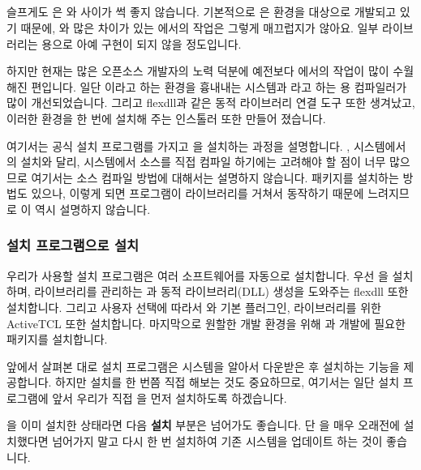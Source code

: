\subsection{\WINDOWS{}}

슬프게도 \OCAML{}은 \WINDOWS{}와 사이가 썩 좋지 않습니다. 기본적으로
\OCAML{}은 \UNIX{} 환경을 대상으로 개발되고 있기 때문에, \UNIX{}와 많은 차이가
있는 \WINDOWS{}에서의 \OCAML{} 작업은 그렇게 매끄럽지가 않아요. 일부
라이브러리는 \WINDOWS{} 용으로 아예 구현이 되지 않을 정도입니다.

하지만 현재는 많은 오픈소스 개발자의 노력 덕분에 예전보다 \WINDOWS{}에서의
작업이 많이 수월해진 편입니다. 일단 \CYGWIN{}이라고 하는 \UNIX{} 환경을
흉내내는 시스템과 \MINGW{}라고 하는 \WINDOWS{} 용 \CC{} 컴파일러가 많이
개선되었습니다. 그리고 \textsf{flexdll}과 같은 동적 라이브러리 연결 도구 또한
생겨났고, 이러한 환경을 한 번에 설치해 주는 인스톨러 또한 만들어 졌습니다.

여기서는 \OCAML{} 공식 설치 프로그램를 가지고 \OCAML{}을 설치하는 과정을
설명합니다. \LINUX{}, \MAC{} 시스템에서의 설치와 달리, \WINDOWS{} 시스템에서
소스를 직접 컴파일 하기에는 고려해야 할 점이 너무 많으므로 여기서는 소스
컴파일 방법에 대해서는 설명하지 않습니다. \CYGWIN{} 패키지를 설치하는 방법도
있으나, 이렇게 되면 \OCAML{} 프로그램이 \CYGWIN{} 라이브러리를 거쳐서 동작하기
때문에 느려지므로 이 역시 설명하지 않습니다.

\subsubsection{설치 프로그램으로 설치}

우리가 사용할 설치 프로그램은 여러 소프트웨어를 자동으로 설치합니다. 우선
\OCAML{}을 설치하며, \OCAML{} 라이브러리를 관리하는 \FINDLIB{}과 동적
라이브러리(DLL) 생성을 도와주는 \textsf{flexdll} 또한 설치합니다. 그리고
사용자 선택에 따라서 \EMACS{}와 \OCAML{} 기본 \EMACS{} 플러그인, \TK{}
라이브러리를 위한 \textsf{ActiveTCL} 또한 설치합니다. 마지막으로 원할한
\OCAML{} 개발 환경을 위해 \CYGWIN{}과 개발에 필요한 패키지를 설치합니다.

앞에서 살펴본 대로 설치 프로그램은 \CYGWIN{} 시스템을 알아서 다운받은 후 설치하는
기능을 제공합니다. 하지만 \CYGWIN{} 설치를 한 번쯤 직접 해보는 것도
중요하므로, 여기서는 일단 설치 프로그램에 앞서 우리가 직접 \CYGWIN{}을 먼저
설치하도록 하겠습니다.

\CYGWIN{}을 이미 설치한 상태라면 다음 \textbf{\CYGWIN{} 설치} 부분은 넘어가도
좋습니다. 단 \CYGWIN{}을 매우 오래전에 설치했다면 넘어가지 말고 다시 한 번
설치하여 기존 시스템을 업데이트 하는 것이 좋습니다.

